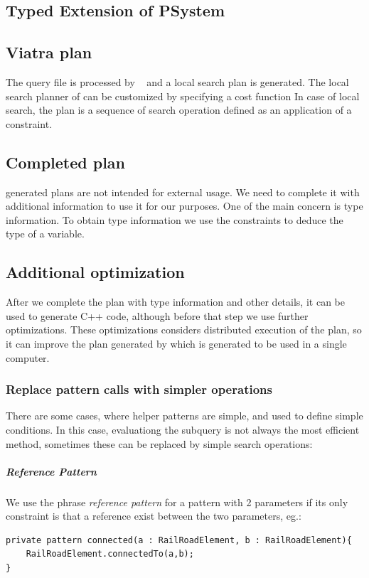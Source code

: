 \subsection{Typed Extension of PSystem}

\subsection{Viatra plan}

The query file is processed by \viatra{}~\cite{viatra} and a local search plan is generated. 
The local search planner of \viatra{} can be customized by specifying a cost function
In case of local search, the plan is a sequence of search operation defined as an application of a constraint.

\subsection{Completed plan}

\viatra{} generated plans are not intended for external usage. 
We need to complete it with additional information to use it for our purposes. 
One of the main concern is type information. To obtain type information we use the constraints to deduce the type of a variable. 


\subsection{Additional optimization}

After we complete the plan with type information and other details, it can be used to generate C++ code, although before that step we use further optimizations. 
These optimizations considers distributed execution of the plan, so it can improve the plan generated by \viatra{} which is generated to be used in a single computer.


\subsubsection{Replace pattern calls with simpler operations}
There are some cases, where helper patterns are simple, and used to define simple conditions. 
In this case, evaluationg the subquery is not always the most efficient method, sometimes these can be replaced by simple search operations:

\subparagraph{Reference Pattern}
We use the phrase \emph{reference pattern} for a pattern with 2 parameters if its only constraint is that a reference exist between the two parameters, eg.:
\begin{lstlisting}[language = vql]
private pattern connected(a : RailRoadElement, b : RailRoadElement){
	RailRoadElement.connectedTo(a,b);
}
\end{lstlisting}

